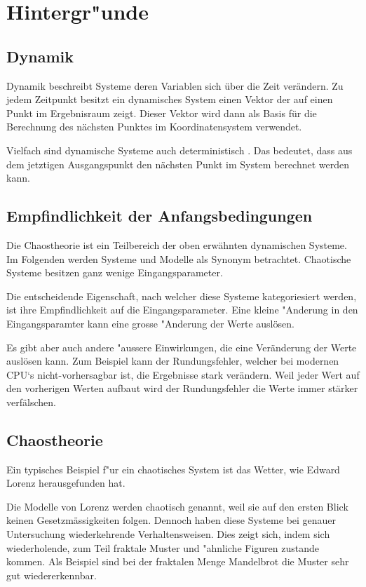 
\section{Hintergr"unde}

\subsection{Dynamik} %
Dynamik beschreibt Systeme deren Variablen sich über die Zeit verändern. Zu jedem Zeitpunkt besitzt ein dynamisches System einen Vektor der auf einen Punkt im Ergebnisraum zeigt. Dieser Vektor wird dann als Basis für die Berechnung des nächsten Punktes im Koordinatensystem verwendet.

Vielfach sind dynamische Systeme auch deterministisch \cite{lorenz:dynamicalsystems}. Das bedeutet, dass aus dem jetztigen Ausgangspunkt den nächsten Punkt im System berechnet werden kann.


\subsection{Empfindlichkeit der Anfangsbedingungen}
Die Chaostheorie ist ein Teilbereich der oben erwähnten dynamischen Systeme. Im Folgenden werden Systeme und Modelle als Synonym betrachtet. Chaotische Systeme besitzen ganz wenige Eingangsparameter.

Die entscheidende Eigenschaft, nach welcher diese Systeme kategoriesiert werden, ist ihre Empfindlichkeit auf die Eingangsparameter. Eine kleine "Anderung in den Eingangsparamter kann eine grosse "Anderung der Werte auslösen.

Es gibt aber auch andere "aussere Einwirkungen, die eine Veränderung der Werte auslösen kann. Zum Beispiel kann der Rundungsfehler, welcher bei modernen CPU‘s nicht-vorhersagbar ist, die Ergebnisse stark verändern. Weil jeder Wert auf den vorherigen Werten aufbaut wird der Rundungsfehler die Werte immer stärker verfälschen.

\subsection{Chaostheorie}
Ein typisches Beispiel f"ur ein chaotisches System ist das Wetter, wie Edward Lorenz herausgefunden hat. 

Die Modelle von Lorenz werden chaotisch genannt, weil sie auf den ersten Blick keinen Gesetzmässigkeiten folgen. Dennoch haben diese Systeme bei genauer Untersuchung wiederkehrende Verhaltensweisen. Dies zeigt sich, indem sich wiederholende, zum Teil fraktale Muster und "ahnliche Figuren zustande kommen. Als Beispiel sind bei der fraktalen Menge Mandelbrot die Muster sehr gut wiedererkennbar. 

